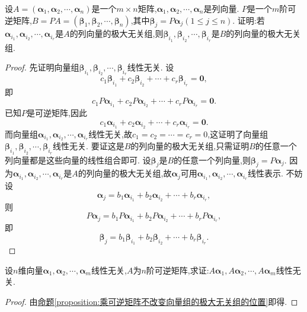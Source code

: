 \documentclass[../../main.tex]{subfiles}%
\begin{document}
\begin{proposition}\label{proposition:乘可逆矩阵不改变向量组的极大无关组的位置}
设\(A = (\boldsymbol{\alpha}_1,\boldsymbol{\alpha}_2,\cdots,\boldsymbol{\alpha}_n)\)是一个\(m\times n\)矩阵,\(\boldsymbol{\alpha}_1,\boldsymbol{\alpha}_2,\cdots,\boldsymbol{\alpha}_n\)是列向量. \(P\)是一个\(m\)阶可逆矩阵,\(B = PA=(\boldsymbol{\beta}_1,\boldsymbol{\beta}_2,\cdots,\boldsymbol{\beta}_n)\),其中\(\boldsymbol{\beta}_j = P\boldsymbol{\alpha}_j(1\leqslant  j\leqslant  n)\). 证明:若\(\boldsymbol{\alpha}_{i_1},\boldsymbol{\alpha}_{i_2},\cdots,\boldsymbol{\alpha}_{i_r}\)是\(A\)的列向量的极大无关组,则\(\boldsymbol{\beta}_{i_1},\boldsymbol{\beta}_{i_2},\cdots,\boldsymbol{\beta}_{i_r}\)是\(B\)的列向量的极大无关组.
\end{proposition}
\begin{proof}
先证明向量组\(\boldsymbol{\beta}_{i_1},\boldsymbol{\beta}_{i_2},\cdots,\boldsymbol{\beta}_{i_r}\)线性无关. 设
\[
c_1\boldsymbol{\beta}_{i_1}+c_2\boldsymbol{\beta}_{i_2}+\cdots + c_r\boldsymbol{\beta}_{i_r}=\boldsymbol{0},
\]
即
\[
c_1P\boldsymbol{\alpha}_{i_1}+c_2P\boldsymbol{\alpha}_{i_2}+\cdots + c_rP\boldsymbol{\alpha}_{i_r}=\boldsymbol{0}.
\]
已知\(P\)是可逆矩阵,因此
\[
c_1\boldsymbol{\alpha}_{i_1}+c_2\boldsymbol{\alpha}_{i_2}+\cdots + c_r\boldsymbol{\alpha}_{i_r}=\boldsymbol{0}.
\]
而向量组\(\boldsymbol{\alpha}_{i_1},\boldsymbol{\alpha}_{i_2},\cdots,\boldsymbol{\alpha}_{i_r}\)线性无关,故\(c_1 = c_2=\cdots = c_r = 0\),这证明了向量组\(\boldsymbol{\beta}_{i_1},\boldsymbol{\beta}_{i_2},\cdots,\boldsymbol{\beta}_{i_r}\)线性无关. 要证这是\(B\)的列向量的极大无关组,只需证明\(B\)的任意一个列向量都是这些向量的线性组合即可. 设\(\boldsymbol{\beta}_j\)是\(B\)的任意一个列向量,则\(\boldsymbol{\beta}_j = P\boldsymbol{\alpha}_j\). 因为\(\boldsymbol{\alpha}_{i_1},\boldsymbol{\alpha}_{i_2},\cdots,\boldsymbol{\alpha}_{i_r}\)是\(A\)的列向量的极大无关组,故\(\boldsymbol{\alpha}_j\)可用\(\boldsymbol{\alpha}_{i_1},\boldsymbol{\alpha}_{i_2},\cdots,\boldsymbol{\alpha}_{i_r}\)线性表示. 不妨设
\[
\boldsymbol{\alpha}_j = b_1\boldsymbol{\alpha}_{i_1}+b_2\boldsymbol{\alpha}_{i_2}+\cdots + b_r\boldsymbol{\alpha}_{i_r},
\]
则
\[
P\boldsymbol{\alpha}_j = b_1P\boldsymbol{\alpha}_{i_1}+b_2P\boldsymbol{\alpha}_{i_2}+\cdots + b_rP\boldsymbol{\alpha}_{i_r},
\]
即
\[
\boldsymbol{\beta}_j = b_1\boldsymbol{\beta}_{i_1}+b_2\boldsymbol{\beta}_{i_2}+\cdots + b_r\boldsymbol{\beta}_{i_r}.
\]
\end{proof}

\begin{corollary}\label{corollary:线性无关向量组乘可逆矩阵仍然线性无关}
设\(n\)维向量\(\boldsymbol{\alpha}_1,\boldsymbol{\alpha}_2,\cdots,\boldsymbol{\alpha}_m\)线性无关,\(A\)为\(n\)阶可逆矩阵,求证:\(A\boldsymbol{\alpha}_1,A\boldsymbol{\alpha}_2,\cdots,A\boldsymbol{\alpha}_m\)线性无关.
\end{corollary}
\begin{proof}
由\hyperref[proposition:乘可逆矩阵不改变向量组的极大无关组的位置]{命题\ref{proposition:乘可逆矩阵不改变向量组的极大无关组的位置}}即得.
\end{proof}
\end{document}
